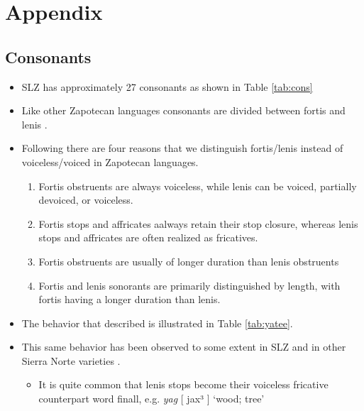 \documentclass[12pt, letterpaper]{article}
\begin{document}

\printbibliography[heading=bibintoc]


\section*{Appendix} 
\subsection*{Consonants} \label{sec:Consonants}

\begin{itemize}
	\item SLZ has approximately 27 consonants as shown in Table \ref{tab:cons}

	\item Like other Zapotecan languages consonants are divided between fortis and lenis \citep{nellisFortisLenisCajonos1980,jaegerInitialConsonantClusters1982,uchiharaFortisLenisGlides2016}.

	\item Following \citet{jaegerInitialConsonantClusters1982} there are four reasons that we distinguish fortis/lenis instead of voiceless/voiced in Zapotecan languages.
	\begin{enumerate}
		\item Fortis obstruents are always voiceless, while lenis can be voiced, partially devoiced, or voiceless.
		\item Fortis stops and affricates aalways retain their stop closure, whereas lenis stops and affricates are often realized as fricatives.
		\item Fortis obstruents are usually of longer duration than lenis obstruents
		\item Fortis and lenis sonorants are primarily distinguished by length, with fortis having a longer duration than lenis. 
	\end{enumerate}
	\item The behavior that \citet{jaegerInitialConsonantClusters1982} described is illustrated in Table \ref{tab:yatee}. 
	\item This same behavior has been observed to some extent in SLZ and in other Sierra Norte varieties \citep{sonnenscheinDescriptiveGrammarSan2005}.
	\begin{itemize}
		\item It is quite common that lenis stops become their voiceless fricative counterpart word finall, e.g. \textit{yag} [ jax³ ] `wood; tree'
	\end{itemize}
\end{itemize}
\end{document}
